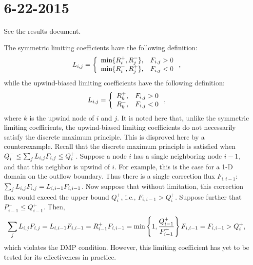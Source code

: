 \section*{6-22-2015}

\begin{enumerate}

See the results document.

The symmetric limiting coefficients have the following definition:
\begin{equation}
  L_{i,j} = \left\{\begin{array}{l l}
    \min\{R_i^+,R_j^-\}, & F_{i,j} > 0 \\
    \min\{R_i^-,R_j^+\}, & F_{i,j} < 0
  \end{array}\right.,
\end{equation}
while the upwind-biased limiting coefficients have the following definition:
\begin{equation}
  L_{i,j} = \left\{\begin{array}{l l}
    R_k^+, & F_{i,j} > 0 \\
    R_k^-, & F_{i,j} < 0
  \end{array}\right.,
\end{equation}
where $k$ is the upwind node of $i$ and $j$. It is noted here that, unlike
the symmetric limiting coefficients, the upwind-biased limiting coefficients
do not necessarily satisfy the discrete maximum principle. This is disproved
here by a counterexample. Recall that the discrete maximum principle is satisfied when
$Q_i^-\le \sum_j L_{i,j} F_{i,j}\le Q_i^+$. Suppose a node $i$ has a single
neighboring node $i-1$, and that this neighbor is upwind of $i$. For example, this is
the case for a 1-D domain on the outflow boundary. Thus there is a single
correction flux $F_{i,i-1}$: $\sum_j L_{i,j} F_{i,j}=L_{i,i-1} F_{i,i-1}$. Now
suppose that without limitation, this correction flux would exceed the
upper bound $Q_i^+$, i.e., $F_{i,i-1}>Q_i^+$. Suppose further that
$P_{i-1}^+\leq Q_{i-1}^+$. Then,
\[
  \sum\limits_j L_{i,j} F_{i,j}=
  L_{i,i-1} F_{i,i-1}=
  R_{i-1}^+ F_{i,i-1}=
  \min\left\{1,\frac{Q_{i-1}^+}{P_{i-1}^+}\right\} F_{i,i-1}=
  F_{i,i-1}>
  Q_i^+,
\]
which violates the DMP condition. However, this limiting coefficient has
yet to be tested for its effectiveness in practice.


\end{enumerate}
